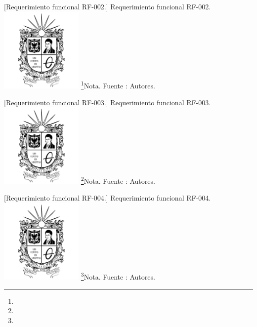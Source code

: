 \begin{itemize}
{\begin{enumerate}
        \vspace{2mm}
        \begin{minipage}{0.9\textwidth}
        \centering
        [{Requerimiento funcional RF-002.}]{ Requerimiento funcional RF-002. }
        \label{req2}
        \includegraphics[width=0.3\textwidth]{Content/Images/Escudo_UD.png}
        \footnote{}{Nota. \textup{Fuente : Autores.}}
        \end{minipage}
        
        \vspace{2mm}
        \begin{minipage}{0.9\textwidth}
        \centering
        [{Requerimiento funcional RF-003.}]{ Requerimiento funcional RF-003. }
        \label{req3}
        \includegraphics[width=0.3\textwidth]{Content/Images/Escudo_UD.png}
        \footnote{}{Nota. \textup{Fuente : Autores.}}
        \end{minipage}
        
        \vspace{2mm}
        \begin{minipage}{0.9\textwidth}
        \centering
        [{Requerimiento funcional RF-004.}]{ Requerimiento funcional RF-004. }
        \label{req4}
        \includegraphics[width=0.3\textwidth]{Content/Images/Escudo_UD.png}
        \footnote{}{Nota. \textup{Fuente : Autores.}}
        \end{minipage}
        

\end{enumerate}}
\end{itemize}
